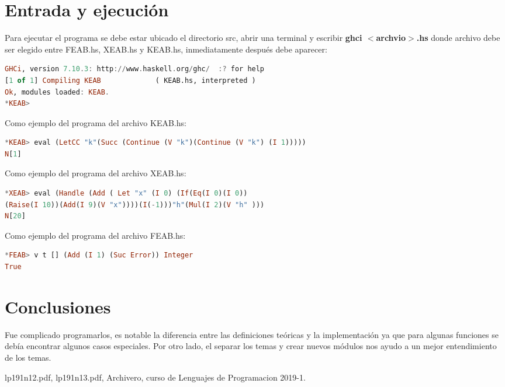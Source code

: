 \documentclass{article}
\begin{document}
\section{Entrada y ejecución}
Para ejecutar el programa se debe estar ubicado el directorio src, abrir una terminal y escribir \textbf{ghci $<$archvio$>$.hs} donde archivo debe ser elegido entre FEAB.hs, XEAB.hs y KEAB.hs, inmediatamente después debe aparecer:\newline
\begin{lstlisting}[language=Haskell]
GHCi, version 7.10.3: http://www.haskell.org/ghc/  :? for help
[1 of 1] Compiling KEAB             ( KEAB.hs, interpreted )
Ok, modules loaded: KEAB.
*KEAB>

\end{lstlisting}\newline
Como ejemplo del programa del archivo KEAB.hs: 
\begin{lstlisting}[language=Haskell]
*KEAB> eval (LetCC "k"(Succ (Continue (V "k")(Continue (V "k") (I 1)))))
N[1]
\end{lstlisting}
Como ejemplo del programa del archivo XEAB.hs: 
\begin{lstlisting}[language=Haskell]
*XEAB> eval (Handle (Add ( Let "x" (I 0) (If(Eq(I 0)(I 0))
(Raise(I 10))(Add(I 9)(V "x"))))(I(-1)))"h"(Mul(I 2)(V "h" )))
N[20]
\end{lstlisting}
Como ejemplo del programa del archivo FEAB.hs: 
\begin{lstlisting}[language=Haskell]
*FEAB> v t [] (Add (I 1) (Suc Error)) Integer
True
\end{lstlisting}

\section{Conclusiones}
Fue complicado programarlos, es notable la diferencia entre las definiciones teóricas y la implementación ya que para algunas funciones se debía encontrar algunos casos especiales.
Por otro lado, el separar los temas y crear nuevos módulos nos ayudo a un mejor entendimiento de los temas.


\begin{thebibliography}{9}

  lp191n12.pdf, lp191n13.pdf, Archivero, curso de Lenguajes de Programacion 2019-1.
\end{thebibliography}
\end{document}
